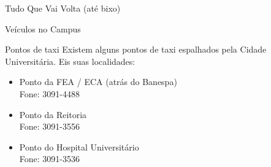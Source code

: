 \begin{secao}{Tudo Que Vai Volta (até bixo)}
\begin{subsecao}{Veículos no Campus}
\end{subsecao}

\begin{subsecao}{Pontos de taxi}
Existem alguns pontos de taxi espalhados pela Cidade Universitária. Eis suas
localidades:

\begin{itemize}
\item Ponto da FEA / ECA (atrás do Banespa)\\
Fone: 3091-4488

\item Ponto da Reitoria\\
Fone: 3091-3556

\item Ponto do Hospital Universitário\\
Fone: 3091-3536
\end{itemize}
\end{subsecao}


\end{secao}
